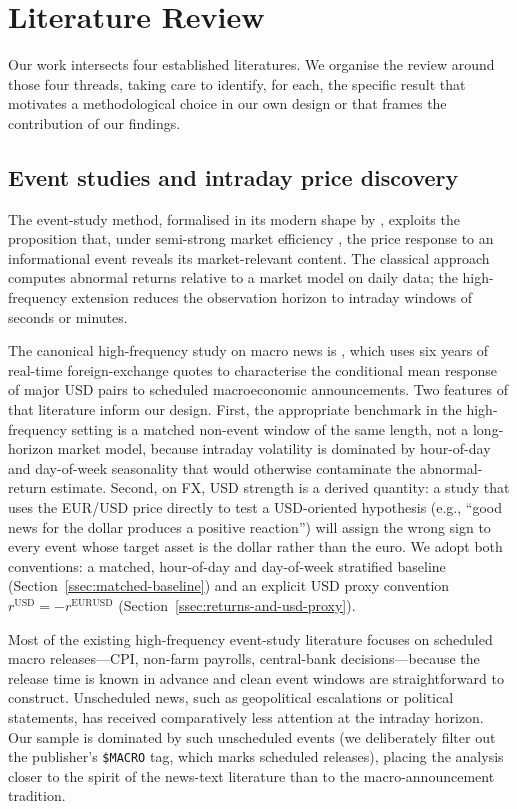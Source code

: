 \section{Literature Review}
\label{sec:literature}

Our work intersects four established literatures. We organise the
review around those four threads, taking care to identify, for each,
the specific result that motivates a methodological choice in our own
design or that frames the contribution of our findings.

\subsection{Event studies and intraday price discovery}
\label{ssec:lit-event-studies}

The event-study method, formalised in its modern shape by
\citet{mackinlay1997event}, exploits the proposition that, under
semi-strong market efficiency \citep{fama1970efficient}, the price
response to an informational event reveals its market-relevant
content. The classical approach computes abnormal returns relative
to a market model on daily data; the high-frequency extension reduces
the observation horizon to intraday windows of seconds or minutes.

The canonical high-frequency study on macro news is
\citet{andersen2003micro}, which uses six years of real-time
foreign-exchange quotes to characterise the conditional mean response
of major USD pairs to scheduled macroeconomic announcements. Two
features of that literature inform our design. First, the appropriate
benchmark in the high-frequency setting is a matched non-event window
of the same length, not a long-horizon market model, because
intraday volatility is dominated by hour-of-day and day-of-week
seasonality that would otherwise contaminate the abnormal-return
estimate. Second, on FX, USD strength is a derived quantity: a study
that uses the EUR/USD price directly to test a USD-oriented hypothesis
(e.g., ``good news for the dollar produces a positive reaction'')
will assign the wrong sign to every event whose target asset is the
dollar rather than the euro. We adopt both conventions: a matched,
hour-of-day and day-of-week stratified baseline
(Section~\ref{ssec:matched-baseline}) and an explicit USD proxy
convention $r^{\text{USD}} = -r^{\text{EURUSD}}$
(Section~\ref{ssec:returns-and-usd-proxy}).

Most of the existing high-frequency event-study literature focuses on
scheduled macro releases---CPI, non-farm payrolls, central-bank
decisions---because the release time is known in advance and clean
event windows are straightforward to construct. Unscheduled news,
such as geopolitical escalations or political statements, has
received comparatively less attention at the intraday horizon. Our
sample is dominated by such unscheduled events (we deliberately
filter out the publisher's \texttt{\$MACRO} tag, which marks
scheduled releases), placing the analysis closer to the spirit of the
news-text literature than to the macro-announcement tradition.

